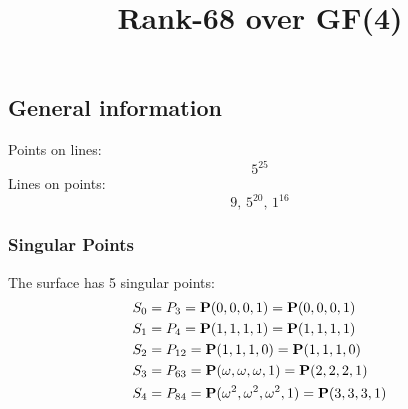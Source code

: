 \documentclass{article}
\newcommand\setTBstruts{\def\T{\rule{0pt}{2.6ex}}%
\def\B{\rule[-1.2ex]{0pt}{0pt}}}
\newcommand{\bP}{{\bf P}}
\begin{document}
 
\setTBstruts



{\allowdisplaybreaks%






\title{Rank-68 over GF(4)}
\author{}%
\maketitle%
%
{}



\subsection*{General information}
Points on lines:
$$
5^{25}$$
Lines on points:
$$
9,\,5^{20},\,1^{16}$$
\subsubsection*{Singular Points}
The surface has 5 singular points:\\
\begin{align*}
S_{0} &= P_{3}=\bP(0, 0, 0, 1) = \bP(0, 0, 0, 1)\\
S_{1} &= P_{4}=\bP(1, 1, 1, 1) = \bP(1, 1, 1, 1)\\
S_{2} &= P_{12}=\bP(1, 1, 1, 0) = \bP(1, 1, 1, 0)\\
S_{3} &= P_{63}=\bP(\omega , \omega , \omega , 1) = \bP(2, 2, 2, 1)\\
S_{4} &= P_{84}=\bP(\omega^{2}, \omega^{2}, \omega^{2}, 1) = \bP(3, 3, 3, 1)\\
\end{align*}
}
\end{document}
